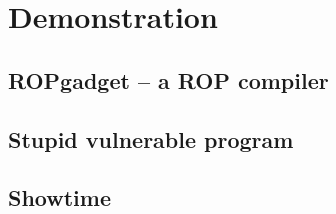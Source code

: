\section{Demonstration}
\subsection{ROPgadget -- a ROP compiler}



\subsection{Stupid vulnerable program}



\subsection{Showtime}
